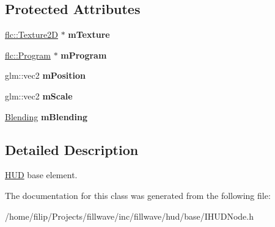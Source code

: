 \subsection*{Protected Attributes}
\begin{DoxyCompactItemize}
\item 
\hyperlink{classflw_1_1flc_1_1Texture2D}{flc\+::\+Texture2D} $\ast$ {\bfseries m\+Texture}\hypertarget{classflw_1_1flf_1_1Sprite_a71013ee08b9240d9d3c700820d9743f0}{}\label{classflw_1_1flf_1_1Sprite_a71013ee08b9240d9d3c700820d9743f0}

\item 
\hyperlink{classflw_1_1flc_1_1Program}{flc\+::\+Program} $\ast$ {\bfseries m\+Program}\hypertarget{classflw_1_1flf_1_1Sprite_a8a3d6ecd8d1b9d6d6b1843200e0d057e}{}\label{classflw_1_1flf_1_1Sprite_a8a3d6ecd8d1b9d6d6b1843200e0d057e}

\item 
glm\+::vec2 {\bfseries m\+Position}\hypertarget{classflw_1_1flf_1_1Sprite_aeea67115ea75ee618461914d139abdc5}{}\label{classflw_1_1flf_1_1Sprite_aeea67115ea75ee618461914d139abdc5}

\item 
glm\+::vec2 {\bfseries m\+Scale}\hypertarget{classflw_1_1flf_1_1Sprite_acbc889fbe0b0a77656c4764ee9e69458}{}\label{classflw_1_1flf_1_1Sprite_acbc889fbe0b0a77656c4764ee9e69458}

\item 
\hyperlink{structflw_1_1flf_1_1Blending}{Blending} {\bfseries m\+Blending}\hypertarget{classflw_1_1flf_1_1Sprite_a1ac47dfe7a7347beba350789870d4549}{}\label{classflw_1_1flf_1_1Sprite_a1ac47dfe7a7347beba350789870d4549}

\end{DoxyCompactItemize}


\subsection{Detailed Description}
\hyperlink{classflw_1_1flf_1_1HUD}{H\+UD} base element. 

The documentation for this class was generated from the following file\+:\begin{DoxyCompactItemize}
\item 
/home/filip/\+Projects/fillwave/inc/fillwave/hud/base/I\+H\+U\+D\+Node.\+h\end{DoxyCompactItemize}
